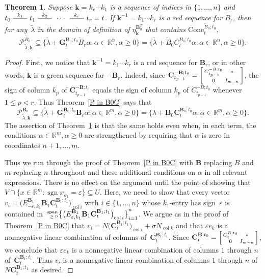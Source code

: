 \documentclass{amsart}
\newtheorem{theorem}[proposition]{Theorem}
\theoremstyle{definition}
\theoremstyle{remark}
\numberwithin{equation}{section}
\newcommand{\reals}{\mathbb R}
\newcommand{\edge}{\,\,\rule[2.7pt]{20pt}{0.5pt}\,\,}
\newcommand{\ep}{\varepsilon}
\newcommand{\col}{\operatorname{col}}
\newcommand{\sgn}{\operatorname{sgn}}
\newcommand{\nnspan}{{\!\!\tiny\begin{array}{r}\mathbf{span}\\\ge0\end{array}\hspace*{-0.57em}}}
\newcommand{\set}[1]{{\lbrace #1 \rbrace}}
\newcommand{\sett}[1]{{\bigl\lbrace #1 \bigr\rbrace}}
\newcommand{\GG}{{\mathbf G}}
\newcommand{\CC}{{\mathbf C}}
\newcommand{\0}{{\mathbf{0}}}
\newcommand{\Cone}{\mathrm{Cone}}
\newcommand{\kk}{{\boldsymbol{k}}}
\newcommand{\tB}{{\widetilde{B}}}
\newcommand{\BB}{\mathbf{B}}
\renewcommand{\P}{\mathcal{P}}
\begin{document}
\begin{theorem}\label{P in B0C extended}
Suppose $\kk=k_r\cdots k_1$ is a sequence of indices in $\set{1,\ldots, n}$ and $t_0\overset{k_1}{\edge}t_1\overset{k_2}{\edge}\,\cdots\,\overset{k_r}{\edge}t_r=t$.
If $\kk^{-1}=k_1\cdots k_r$ is a red sequence for $B_r$, then for any~$\tilde\lambda$ in the domain of definition of $\eta_\kk^{\BB_0^T}$ that contains $\Cone^{\tB_0;t_0}_t$,
\[\P^{\tB_0}_{\tilde\lambda,\kk}\subseteq\set{\tilde\lambda+\GG_t^{\BB_0;t_0}\tB_r\alpha:\alpha\in\reals^n,\alpha\ge0}=\set{\tilde\lambda+\tB_0C_t^{B_0;t_0}\alpha:\alpha\in\reals^n,\alpha\ge0}.\]
\end{theorem}
\begin{proof}
First, we notice that $\kk^{-1}=k_1\cdots k_r$ is a red sequence for $\BB_r$, or in other words, $\kk$ is a green sequence for $-\BB_r$.
Indeed, since $\CC_{t_{p-1}}^{-\BB;t_0}=\begin{bsmallmatrix}C_{t_{p-1}}^{-B;t_0}&*\\\\0&I_{m-n}\end{bsmallmatrix}$, the sign of column $k_p$ of $\CC_{t_{p-1}}^{-\BB;t_0}$ equals the sign of column $k_p$ of $C_{t_{p-1}}^{-B;t_0}$ whenever $1\le p<r$.
Thus Theorem~\ref{P in B0C} says that
\[\P^{\BB_0}_{\tilde\lambda,\kk}\subseteq\set{\tilde\lambda+\GG_t^{\BB_0;t_0}\BB_r\alpha:\alpha\in\reals^m,\alpha\ge0}=\set{\tilde\lambda+\BB_0\CC_t^{\BB_0;t_0}\alpha:\alpha\in\reals^m,\alpha\ge0}.\]
The assertion of Theorem~\ref{P in B0C extended} is that the same holds even when, in each term, the conditions $\alpha\in\reals^m,\alpha\ge0$ are strengthened by requiring that $\alpha$ is zero in coordinates $n+1,\ldots,m$.

Thus we run through the proof of Theorem~\ref{P in B0C} with $\BB$ replacing $B$ and $m$ replacing $n$ throughout and these additional conditions on $\alpha$ in all relevant expressions.
There is no effect on the argument until the point of showing that $V\cap\set{x\in\reals^m:\sgn x_{k_1}=\ep}\subseteq U$.
Here, we need to show that every vector $v_i=\bigl(E^{\BB_1}_{-\ep,k_1}\BB_1\CC_t^{\BB_1;t_1}\bigr)_{\col i}$ with $i\in\set{1,\ldots,n}$ whose $k_1$-entry has sign~$\ep$ is contained in $\nnspan\sett{\bigl(E^{\BB_1}_{\ep,k_1}\BB_1\CC_t^{\BB_1;t_1}\bigr)_{\col i}}_{i=1}^n$.
We argue as in the proof of Theorem~\ref{P in B0C} that $v_i=N\bigl(\CC_t^{\BB_1;t_1}\bigr)_{\col i}+\sigma N_{\col k}$ and that $\ep e_k$ is a nonnegative linear combination of columns of~$\CC_t^{\BB_1;t_1}$.
Since $\CC_t^{\BB;t_0}=\begin{bsmallmatrix}C_t^{B;t_0}&*\\0&I_{m-n}\end{bsmallmatrix}$, we conclude that $\ep e_k$ is a nonnegative linear combination of columns $1$ through $n$ of~$\CC_t^{\BB_1;t_1}$.
Thus $v_i$ is a nonnegative linear combination of columns $1$ through $n$ of~$N\CC_t^{\BB_1;t_1}$ as desired.
\end{proof}
\end{document}
